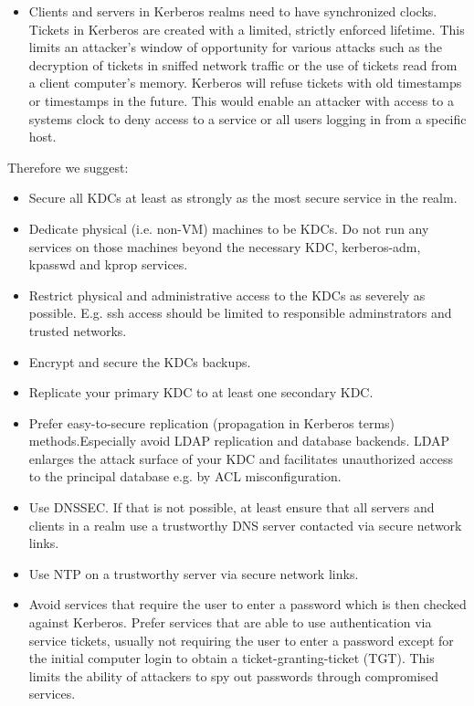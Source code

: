\begin{itemize}
	\item Clients and servers in Kerberos realms need to have synchronized clocks. Tickets in Kerberos are created with a limited, strictly enforced lifetime. This limits an attacker's window of opportunity for various attacks such as the decryption of tickets in sniffed network traffic or the use of tickets read from a client computer's memory. Kerberos will refuse tickets with old timestamps or timestamps in the future. This would enable an attacker with access to a systems clock to deny access to a service or all users logging in from a specific host.
\end{itemize}

Therefore we suggest:
\begin{itemize}
	\item Secure all KDCs at least as strongly as the most secure service in the realm.
	\item Dedicate physical (i.e. non-VM) machines to be KDCs. Do not run any services on those machines beyond the necessary KDC, kerberos-adm, kpasswd and kprop services. 
	\item Restrict physical and administrative access to the KDCs as severely as possible. E.g. ssh access should be limited to responsible adminstrators and trusted networks. 
	\item Encrypt and secure the KDCs backups.
	\item Replicate your primary KDC to at least one secondary KDC.
	\item Prefer easy-to-secure replication (propagation in Kerberos terms) methods.Especially avoid LDAP replication and database backends. LDAP enlarges the attack surface of your KDC and facilitates unauthorized access to the principal database e.g. by ACL misconfiguration.
	\item Use DNSSEC. If that is not possible, at least ensure that all servers and clients in a realm use a trustworthy DNS server contacted via secure network links.
	\item Use NTP on a trustworthy server via secure network links. 
	\item Avoid services that require the user to enter a password which is then checked against Kerberos. Prefer services that are able to use authentication via service tickets, usually not requiring the user to enter a password except for the initial computer login to obtain a ticket-granting-ticket (TGT). This limits the ability of attackers to spy out passwords through compromised services.
\end{itemize}


